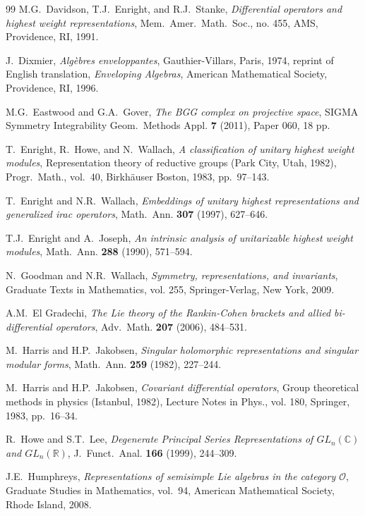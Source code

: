 \documentclass[reqno,11pt]{amsart}
\theoremstyle{remark}
\numberwithin{equation}{section}
\newcommand{\R}{\mathbb{R}}
\begin{document}
\begin{thebibliography}{99}
M.G.~Davidson, T.J.~Enright, and R.J.~Stanke, \emph{Differential operators and highest weight representations},
  Mem.~Amer.~Math.~Soc., no. 455, AMS, Providence, RI, 1991.

J.~Dixmier, \emph{Alg\`ebres enveloppantes}, Gauthier-Villars, Paris, 1974,
  reprint of English translation, \emph{Enveloping Algebras}, American
  Mathematical Society, Providence, RI, 1996.

M.G.~Eastwood and G.A.~Gover, \emph{{The BGG complex on projective space}},
  SIGMA Symmetry Integrability Geom.~Methods Appl. \textbf{7} (2011), Paper
  060, 18 pp.

T.~Enright, R.~Howe, and N.~Wallach, \emph{{A classification of unitary highest
  weight modules}}, Representation theory of reductive groups (Park City, Utah,
  1982), Progr.~Math., vol.~40, Birkh\"auser Boston, 1983, pp.~97--143.

T.~Enright and N.R.~Wallach, \emph{Embeddings of unitary highest
  representations and generalized irac operators}, Math.~Ann.
  \textbf{307} (1997), 627--646.

T.J.~Enright and A.~Joseph, \emph{{An intrinsic analysis of unitarizable
  highest weight modules}}, Math.\ Ann. \textbf{288} (1990), 571--594.

N.~Goodman and N.R.~Wallach, \emph{Symmetry, representations, and invariants},
  Graduate Texts in Mathematics, vol. 255, Springer-Verlag, New York, 2009.

A.M.~El Gradechi, \emph{{The Lie theory of the Rankin-Cohen brackets and allied
  bi-diﬀerential operators}}, Adv.\ Math. \textbf{207} (2006), 484--531.

M.~Harris and H.P.~Jakobsen, \emph{Singular holomorphic representations and
  singular modular forms}, Math.~Ann. \textbf{259} (1982), 227--244.

M.~Harris and H.P.~Jakobsen, \emph{{Covariant differential operators}}, Group theoretical methods
  in physics (Istanbul, 1982), Lecture Notes in Phys., vol. 180, Springer,
  1983, pp.~16--34.

R.~Howe and S.T.~Lee, \emph{{Degenerate Principal Series Representations of
  $GL_n(\mathbb{C})$ and $GL_n(\mathbb{\R})$}}, J.\ Funct.\ Anal. \textbf{166}
  (1999), 244--309.

J.E.~Humphreys, \emph{Representations of semisimple \textit{L}ie algebras in
  the  category $\mathcal{O}$}, Graduate Studies in Mathematics,
  vol.~94, American Mathematical Society, Rhode Island, 2008.


\end{thebibliography}
\end{document}
